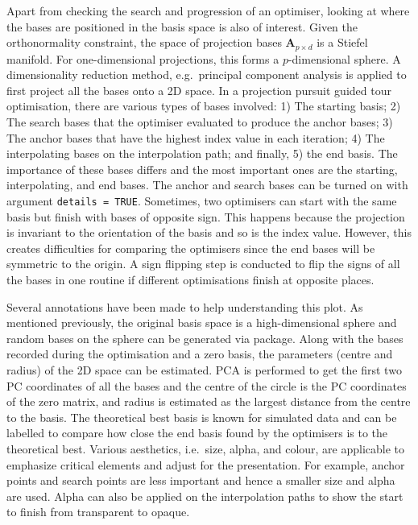 Apart from checking the search and progression of an optimiser, looking
at where the bases are positioned in the basis space is also of
interest. Given the orthonormality constraint, the space of projection
bases \(\mathbf{A}_{p \times d}\) is a Stiefel manifold. For
one-dimensional projections, this forms a \(p\)-dimensional sphere. A
dimensionality reduction method, e.g.~principal component analysis is
applied to first project all the bases onto a 2D space. In a projection
pursuit guided tour optimisation, there are various types of bases
involved: 1) The starting basis; 2) The search bases that the optimiser
evaluated to produce the anchor bases; 3) The anchor bases that have the
highest index value in each iteration; 4) The interpolating bases on the
interpolation path; and finally, 5) the end basis. The importance of
these bases differs and the most important ones are the starting,
interpolating, and end bases. The anchor and search bases can be turned
on with argument \texttt{details\ =\ TRUE}. Sometimes, two optimisers
can start with the same basis but finish with bases of opposite sign.
This happens because the projection is invariant to the orientation of
the basis and so is the index value. However, this creates difficulties
for comparing the optimisers since the end bases will be symmetric to
the origin. A sign flipping step is conducted to flip the signs of all
the bases in one routine if different optimisations finish at opposite
places.

Several annotations have been made to help understanding this plot. As
mentioned previously, the original basis space is a high-dimensional
sphere and random bases on the sphere can be generated via
 \citep{geozoo} package. Along with the bases recorded
during the optimisation and a zero basis, the parameters (centre and
radius) of the 2D space can be estimated. PCA is performed to get the
first two PC coordinates of all the bases and the centre of the circle
is the PC coordinates of the zero matrix, and radius is estimated as the
largest distance from the centre to the basis. The theoretical best
basis is known for simulated data and can be labelled to compare how
close the end basis found by the optimisers is to the theoretical best.
Various aesthetics, i.e.~size, alpha, and colour, are applicable to
emphasize critical elements and adjust for the presentation. For
example, anchor points and search points are less important and hence a
smaller size and alpha are used. Alpha can also be applied on the
interpolation paths to show the start to finish from transparent to
opaque.

